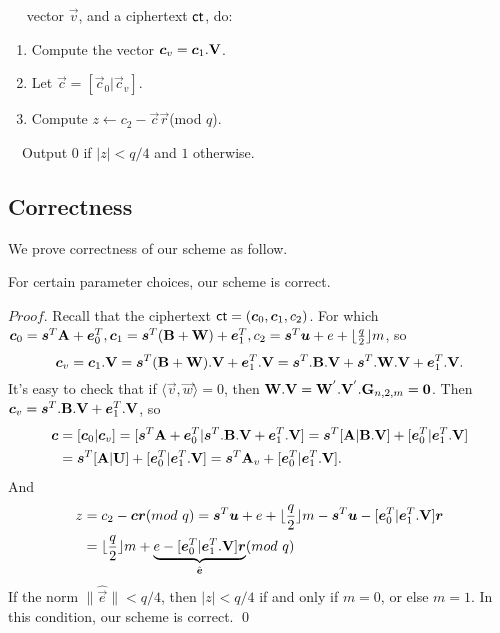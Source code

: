 ~~ vector $\vec{v}$, and a ciphertext $\mathsf{ct}$, do:
\begin{enumerate}
\item Compute the vector $\boldsymbol{c}_{v}=\boldsymbol{c}_{1}.\mathbf{V}$.\

\item Let $\vec{c}=[\vec{c}_{0}|\vec{c}_{v}]$.\

\item Compute $ z\leftarrow c_{2}-\vec{c}\vec{r}$(mod $q$).
\end{enumerate}
~~Output $0$ if $|z|<q/4$ and $1$ otherwise.\\[0.2cm]


\subsection{Correctness}
We prove correctness of our scheme as follow.
\begin{lemma}
For certain parameter choices, our scheme is correct.
\end{lemma}
\noindent $Proof$. Recall that the ciphertext $\mathsf{ct}=(\boldsymbol{c}_{0},\boldsymbol{c}_{1},c_{2})$. For which $\boldsymbol{c}_{0}=\boldsymbol{s}^{T}\mathbf{A}+\boldsymbol{e}^{T}_{0},  \boldsymbol{c}_{1}=\boldsymbol{s}^{T}(\mathbf{B}+\mathbf{W})+\boldsymbol{e}^{T}_{1}, c_{2}=\boldsymbol{s}^{T}\boldsymbol{u}+e+\lfloor \frac{q}{2} \rfloor m$, so
\begin{equation}
\boldsymbol{c}_{v}=\boldsymbol{c}_{1}.\mathbf{V}=\boldsymbol{s}^{T}(\mathbf{B}+\mathbf{W}).\mathbf{V}+\boldsymbol{e}^{T}_{1}.\mathbf{V}=\boldsymbol{s}^{T}.\mathbf{B}.\mathbf{V}+\boldsymbol{s}^{T}.\mathbf{W}.\mathbf{V}+
\boldsymbol{e}^{T}_{1}.\mathbf{V}.
\end{equation}
It's easy to check that if $\langle \vec{v},\vec{w} \rangle=0$, then $\mathbf{W}.\mathbf{V}=\mathbf{W}^{'}.\mathbf{V}^{'}.\mathbf{G}_{n,2,m}=\mathbf{0}$. Then $\boldsymbol{c}_{v}=\boldsymbol{s}^{T}.\mathbf{B}.\mathbf{V}+\boldsymbol{e}^{T}_{1}.\mathbf{V}$, so
\begin{equation}
\begin{aligned}
\boldsymbol{c}&=[\boldsymbol{c}_{0}|\boldsymbol{c}_{v}]=[\boldsymbol{s}^{T}\mathbf{A}+\boldsymbol{e}^{T}_{0}|\boldsymbol{s}^{T}.\mathbf{B}.\mathbf{V}+\boldsymbol{e}^{T}_{1}.\mathbf{V}]=\boldsymbol{s}^{T}[\mathbf{A}|\mathbf{B}.\mathbf{V}]+[\boldsymbol{e}^{T}_{0}|\boldsymbol{e}^{T}_{1}.\mathbf{V}]\\
&=\boldsymbol{s}^{T}[\mathbf{A}|\mathbf{U}]+[\boldsymbol{e}^{T}_{0}|\boldsymbol{e}^{T}_{1}.\mathbf{V}]=\boldsymbol{s}^{T}\mathbf{A}_{v}+[\boldsymbol{e}^{T}_{0}|\boldsymbol{e}^{T}_{1}.\mathbf{V}].
\end{aligned}
\end{equation}
And
\begin{equation}
\begin{aligned}
z&=c_{2}-\vec{c}\vec{r}(mod\ q)=\vec{s}^{T}\vec{u}+e+\lfloor \frac{q}{2} \rfloor m-\vec{s}^{T}\vec{u}-[\vec{e}^{T}_{0}|\vec{e}^{T}_{1}.\mat{V}]\vec{r}\\
&=\lfloor \frac{q}{2} \rfloor m+\underbrace{e-[\vec{e}^{T}_{0}|\vec{e}^{T}_{1}.\mat{V}]\vec{r}}_{\hat{\vec{e}}}(mod\ q)
\end{aligned}
\end{equation}
If the norm $\|\hat{\vec{e}}\|< q/4$, then $|z|< q/4$ if and only if $m=0$, or else $m=1$. In this condition, our scheme is correct.  \qed
